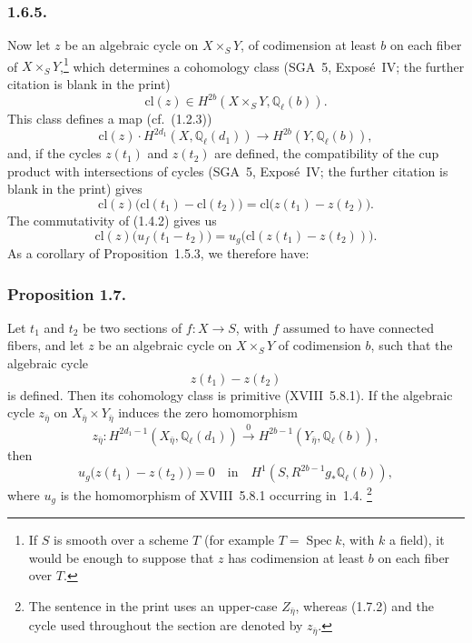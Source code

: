 \subsubsection*{1.6.5.}
Now let $z$ be an algebraic cycle on $X\times_S Y$, of codimension at least
$b$ on each fiber of $X\times_S Y$,\footnote{If $S$ is smooth over a scheme
$T$ (for example $T=\operatorname{Spec}k$, with $k$ a field), it would be
enough to suppose that $z$ has codimension at least $b$ on each fiber over
$T$.} which determines a cohomology class (SGA~5, Expos\'e~IV; the further
citation is blank in the print)
\begin{equation}\tag{1.6.6}
\mathrm{cl}(z)\in H^{2b}(X\times_S Y,\mathbb Q_\ell(b)).
\end{equation}
This class defines a map (cf.~(1.2.3))
\begin{equation}\tag{1.6.7}
\mathrm{cl}(z)\mathbin{\cdot}H^{2d_1}(X,\mathbb Q_\ell(d_1))
\longrightarrow H^{2b}(Y,\mathbb Q_\ell(b)),
\end{equation}
and, if the cycles $z(t_1)$ and $z(t_2)$ are defined, the compatibility of
the cup product with intersections of cycles (SGA~5, Expos\'e~IV; the
further citation is blank in the print) gives
\begin{equation}\tag{1.6.8}
\mathrm{cl}(z)\bigl(\mathrm{cl}(t_1)-\mathrm{cl}(t_2)\bigr)
=\mathrm{cl}\bigl(z(t_1)-z(t_2)\bigr).
\end{equation}
The commutativity of (1.4.2) gives us
\begin{equation}\tag{1.6.9}
\mathrm{cl}(z)\bigl(u_f(t_1-t_2)\bigr)
=u_g\bigl(\mathrm{cl}(z(t_1)-z(t_2))\bigr).
\end{equation}
As a corollary of Proposition~1.5.3, we therefore have:

\subsubsection*{Proposition 1.7.}
Let $t_1$ and $t_2$ be two sections of $f:X\longrightarrow S$, with $f$
assumed to have connected fibers, and let $z$ be an algebraic cycle on
$X\times_S Y$ of codimension $b$, such that the algebraic cycle
\begin{equation}\tag{1.7.1}
z(t_1)-z(t_2)
\end{equation}
is defined.  Then its cohomology class is primitive (XVIII~5.8.1).  If the
algebraic cycle $z_{\bar\eta}$ on
$X_{\bar\eta}\times Y_{\bar\eta}$ induces the zero homomorphism
\begin{equation}\tag{1.7.2}
z_{\bar\eta}:H^{2d_1-1}(X_{\bar\eta},\mathbb Q_\ell(d_1))
\stackrel{0}{\longrightarrow}
H^{2b-1}(Y_{\bar\eta},\mathbb Q_\ell(b)),
\end{equation}
then
\begin{equation}\tag{1.7.3}
u_g\bigl(z(t_1)-z(t_2)\bigr)=0\quad\text{in}\quad
H^1(S,R^{2b-1}g_*\mathbb Q_\ell(b)),
\end{equation}
where $u_g$ is the homomorphism of XVIII~5.8.1 occurring in~1.4.
\footnote{The sentence in the print uses an upper-case $Z_{\bar\eta}$,
whereas (1.7.2) and the cycle used throughout the section are denoted by
$z_{\bar\eta}$.}
